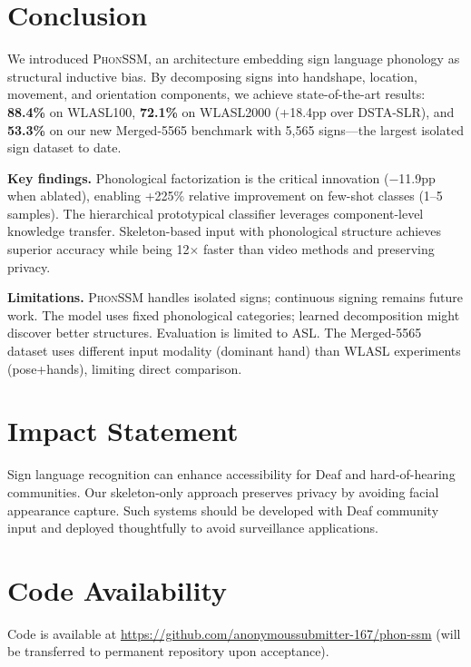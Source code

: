 \documentclass{article}
\theoremstyle{definition}
\theoremstyle{remark}
\newcommand{\phonssm}{\textsc{PhonSSM}}
\begin{document}
\section{Conclusion}

We introduced \phonssm{}, an architecture embedding sign language phonology as structural inductive bias. By decomposing signs into handshape, location, movement, and orientation components, we achieve state-of-the-art results: \textbf{88.4\%} on WLASL100, \textbf{72.1\%} on WLASL2000 (+18.4pp over DSTA-SLR), and \textbf{53.3\%} on our new Merged-5565 benchmark with 5,565 signs---the largest isolated sign dataset to date.

\textbf{Key findings.} Phonological factorization is the critical innovation ($-$11.9pp when ablated), enabling +225\% relative improvement on few-shot classes (1--5 samples). The hierarchical prototypical classifier leverages component-level knowledge transfer. Skeleton-based input with phonological structure achieves superior accuracy while being 12$\times$ faster than video methods and preserving privacy.

\textbf{Limitations.} \phonssm{} handles isolated signs; continuous signing remains future work. The model uses fixed phonological categories; learned decomposition might discover better structures. Evaluation is limited to ASL. The Merged-5565 dataset uses different input modality (dominant hand) than WLASL experiments (pose+hands), limiting direct comparison.

\section*{Impact Statement}

Sign language recognition can enhance accessibility for Deaf and hard-of-hearing communities. Our skeleton-only approach preserves privacy by avoiding facial appearance capture. Such systems should be developed with Deaf community input and deployed thoughtfully to avoid surveillance applications.




\newpage
\appendix
\section{Code Availability}
Code is available at \url{https://github.com/anonymoussubmitter-167/phon-ssm} (will be transferred to permanent repository upon acceptance).
\end{document}
